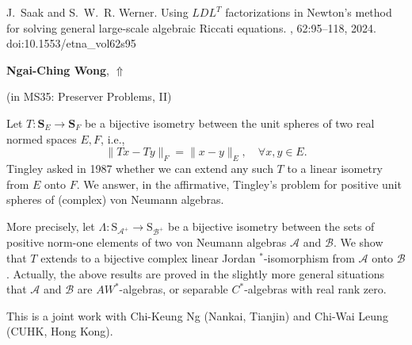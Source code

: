 \documentclass[ILAS2025-program.tex]{subfiles}
\begin{document}
\begin{ilasabstract}
\begin{bibunit}
\begin{thebibliography}{10}
J.~Saak and S.~W.~R. Werner.
\newblock Using {$LDL^{T}$} factorizations in {N}ewton's method for solving
  general large-scale algebraic {R}iccati equations.
, 62:95--118, 2024.
\newblock doi:10.1553/etna\_vol62s95
\end{thebibliography}

        \end{bibunit}
        
\end{ilasabstract}
    

\hypertarget{down0317}{}\begin{ilasabstract}
    
\textbf{Ngai-Ching Wong},  \hfill \hyperlink{up0317}{$\Uparrow$}
    
    
(in {\color{mstitle}MS35: Preserver Problems, II})
        
\mtskip
    Let $T: \mathbf{S}_E\to \mathbf{S}_F$ be a bijective isometry  between the unit spheres of two real normed spaces $E, F$,
 i.e.,
$$
\|Tx - Ty\|_F = \|x-y\|_E, \quad\forall x,y\in E.
$$
Tingley  asked in 1987 whether we  
can   extend any such $T$ to a linear isometry from $E$ onto $F$.
We answer, in the affirmative,
Tingley's problem for positive unit spheres of (complex) von Neumann algebras.  

More precisely,
let $\Lambda: \mathrm{S}_{\mathcal{A}^+} \to \mathrm{S}_{\mathcal{B}^+}$ be a bijective isometry
between the sets of positive norm-one elements of two von Neumann algebras $\mathcal{A}$ and $\mathcal{B}$.
We show that $T$ extends to a bijective complex linear Jordan $^*$-isomorphism from $\mathcal{A}$ onto $\mathcal{B}$.
Actually, the above results are proved in the slightly more general situations that $\mathcal{A}$ and $\mathcal{B}$ are  $AW^*$-algebras, or separable $C^*$-algebras with real rank zero.  

This is a joint work with Chi-Keung Ng (Nankai, Tianjin) and Chi-Wai Leung (CUHK, Hong Kong).

\end{ilasabstract}
    
\end{document}

